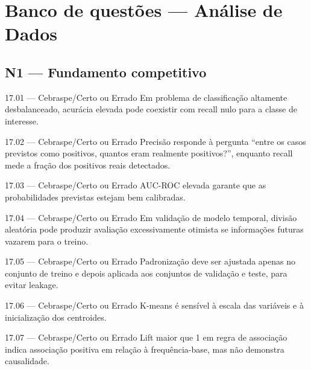 \section{Banco de questões — Análise de Dados}

\subsection*{N1 — Fundamento competitivo}

\begin{questao}{ 17.01 — Cebraspe/Certo ou Errado}
Em problema de classificação altamente desbalanceado, acurácia elevada pode coexistir com recall nulo para a classe de interesse.
\end{questao}

\begin{questao}{ 17.02 — Cebraspe/Certo ou Errado}
Precisão responde à pergunta ``entre os casos previstos como positivos, quantos eram realmente positivos?'', enquanto recall mede a fração dos positivos reais detectados.
\end{questao}

\begin{questao}{ 17.03 — Cebraspe/Certo ou Errado}
AUC-ROC elevada garante que as probabilidades previstas estejam bem calibradas.
\end{questao}

\begin{questao}{ 17.04 — Cebraspe/Certo ou Errado}
Em validação de modelo temporal, divisão aleatória pode produzir avaliação excessivamente otimista se informações futuras vazarem para o treino.
\end{questao}

\begin{questao}{ 17.05 — Cebraspe/Certo ou Errado}
Padronização deve ser ajustada apenas no conjunto de treino e depois aplicada aos conjuntos de validação e teste, para evitar leakage.
\end{questao}

\begin{questao}{ 17.06 — Cebraspe/Certo ou Errado}
K-means é sensível à escala das variáveis e à inicialização dos centroides.
\end{questao}

\begin{questao}{ 17.07 — Cebraspe/Certo ou Errado}
Lift maior que 1 em regra de associação indica associação positiva em relação à frequência-base, mas não demonstra causalidade.
\end{questao}

